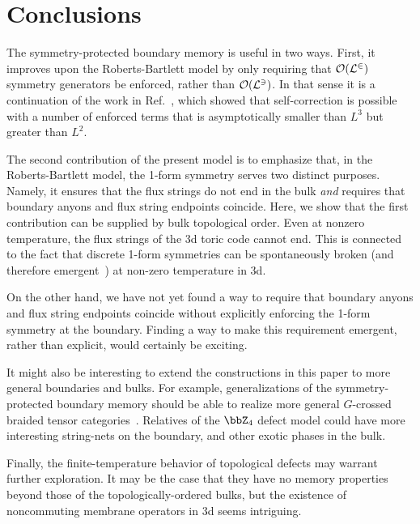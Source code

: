 \section{Conclusions} \label{sec:conc}

The symmetry-protected boundary memory is useful in two ways. First, it improves upon the Roberts-Bartlett model by only requiring that $\cal{O}(L^2)$ symmetry generators be enforced, rather than $\cal{O}(L^3)$. In that sense it is a continuation of the work in Ref.~\cite{StahlNandkishore2021}, which showed that self-correction is possible with a number of enforced terms that is asymptotically smaller than $L^3$ but greater than $L^2$.

The second contribution of the present model is to emphasize that, in the Roberts-Bartlett model, the 1-form symmetry serves two distinct purposes. Namely, it ensures that the flux strings do not end in the bulk \emph{and} requires that boundary anyons and flux string endpoints coincide. Here, we show that the first contribution can be supplied by bulk topological order. Even at nonzero temperature, the flux strings of the 3d toric code cannot end. This is connected to the fact that discrete 1-form symmetries can be spontaneously broken (and therefore emergent~\cite{Wen2019Higher}) at non-zero temperature in 3d.

On the other hand, we have not yet found a way to require that boundary anyons and flux string endpoints coincide without explicitly enforcing the 1-form symmetry at the boundary. Finding a way to make this requirement emergent, rather than explicit, would certainly be exciting. 

It might also be interesting to extend the constructions in this paper to more general boundaries and bulks. For example, generalizations of the symmetry-protected boundary memory should be able to realize more general $G$-crossed braided tensor categories~\cite{Barkeshli2019Fractionalization}. Relatives of the $\bbZ_4$ defect model could have more interesting string-nets on the boundary, and other exotic phases in the bulk.

Finally, the finite-temperature behavior of topological defects may warrant further exploration. It may be the case that they have no memory properties beyond those of the topologically-ordered bulks, but the existence of noncommuting membrane operators in 3d seems intriguing. 

%
%
%	
%